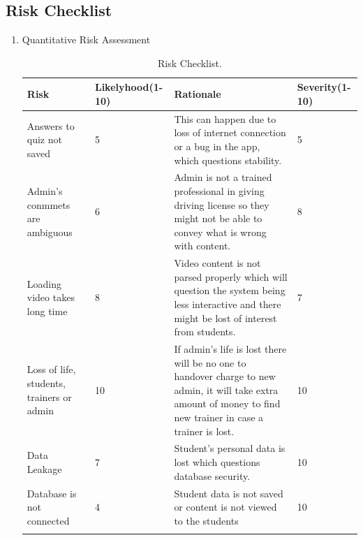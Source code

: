 \documentclass{report}
\begin{document}
\subsection{Risk Checklist}
    \begin{enumerate}
        \item Quantitative Risk Assessment \\
        \begin{longtable}{|p{4.5cm}|p{2.5cm}|p{4.5cm}|p{2.5cm}|} \hline
        Risk&Likelyhood(1-10)&Rationale&Severity(1-10)\\ \hline
        Answers to quiz not saved&5&This can happen due to loss of internet connection or a bug in the app, which questions stability.&5\\ \hline
        Admin's conmmets are ambiguous&6&Admin is not a trained professional in giving driving license so they might not be able to convey what is wrong with content.&8\\ \hline
        Loading video takes long time&8&Video content is not parsed properly which will question the system being less interactive and there might be lost of interest from students.&7\\ \hline
        Loss of life, students, trainers or admin&10&If admin's life is lost there will be no one to handover charge to new admin, it will take extra amount of money to find new trainer in case a trainer is lost.&10\\ \hline
        Data Leakage&7&Student's personal data is lost which questions database security.&10\\ \hline
        Database is not connected&4&Student data is not saved or content is not viewed to the students&10\\ \hline
        \caption{Risk Checklist.\label{long}}\\
        \end{longtable}
        

\end{enumerate}
\end{document}
